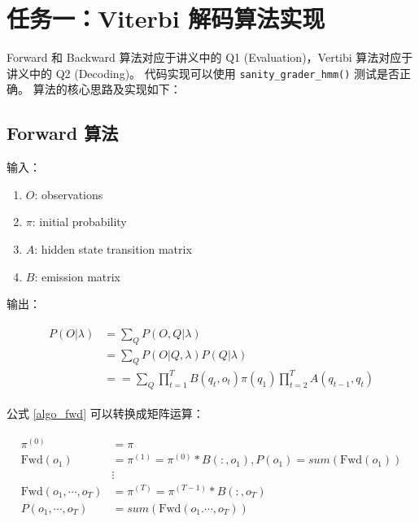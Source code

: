 \documentclass[degree=project, degree-type=project]{thuthesis}
\begin{document}
\maketitle

\frontmatter
% 

\tableofcontents

\listoffigures           %

\mainmatter

\chapter{任务一：Viterbi 解码算法实现}

Forward 和 Backward 算法对应于讲义中的 Q1 (Evaluation)，Vertibi 算法对应于讲义中的 Q2 (Decoding)。
代码实现可以使用 \texttt{sanity\_grader\_hmm()} 测试是否正确。
算法的核心思路及实现如下：

\section{Forward 算法}
  输入：

  \begin{enumerate}
    \item $O$: observations
    \item $\pi$: initial probability
    \item $A$: hidden state transition matrix
    \item $B$: emission matrix
  \end{enumerate}

  输出：

  \begin{align}
    \begin{split}
      P(O | \lambda) &= \sum_{Q} P(O, Q | \lambda) \\
      &= \sum_Q P(O | Q, \lambda) P(Q | \lambda) \\
      &=  = \sum_Q \prod_{t=1}^T B(q_t, o_t) \pi(q_1) \prod_{t=2}^T A(q_{t-1}, q_t)
    \end{split}
    \label{algo_fwd}
  \end{align}

  公式 \ref{algo_fwd} 可以转换成矩阵运算：

  \begin{align}
    \begin{split}
      \pi^{(0)} &= \pi \\
      \text{Fwd}(o_1) &= \pi^{(1)} = \pi^{(0)} * B(:, o_1), P(o_1) = sum(\text{Fwd}(o_1)) \\
      &\vdots \\
      \text{Fwd}(o_1, \cdots, o_T) &= \pi^{(T)} = \pi^{(T-1)} * B(:, o_T) \\
      P(o_1, \cdots, o_T) &= sum(\text{Fwd}(o_1. \cdots, o_T))
    \end{split}
  \end{align}
\end{document}
